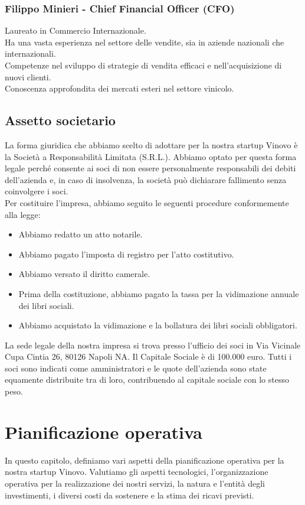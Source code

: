 \documentclass[12pt, a4paper]{article}
\newcommand{\meskip}{\medskip \\}
\begin{document}
\subsubsection*{Filippo Minieri - Chief Financial Officer (CFO)}
Laureato in Commercio Internazionale.\\
Ha una vasta esperienza nel settore delle vendite, sia in aziende nazionali che internazionali.\\
Competenze nel sviluppo di strategie di vendita efficaci e nell'acquisizione di nuovi clienti.\\
Conoscenza approfondita dei mercati esteri nel settore vinicolo.

\subsection{Assetto societario}
La forma giuridica che abbiamo scelto di adottare per la nostra startup Vinovo è la Società a Responsabilità Limitata (S.R.L.). Abbiamo optato per questa forma legale perché consente ai soci di non essere personalmente responsabili dei debiti dell'azienda e, in caso di insolvenza, la società può dichiarare fallimento senza coinvolgere i soci.\meskip
Per costituire l'impresa, abbiamo seguito le seguenti procedure conformemente alla legge:
\begin{itemize}
    \item Abbiamo redatto un atto notarile.
    \item Abbiamo pagato l'imposta di registro per l'atto costitutivo.
    \item Abbiamo versato il diritto camerale.
    \item Prima della costituzione, abbiamo pagato la tassa per la vidimazione annuale dei libri sociali.
    \item Abbiamo acquistato la vidimazione e la bollatura dei libri sociali obbligatori.
\end{itemize}
La sede legale della nostra impresa si trova presso l'ufficio dei soci in Via Vicinale Cupa Cintia 26, 80126 Napoli NA. Il Capitale Sociale è di 100.000 euro. Tutti i soci sono indicati come amministratori e le quote dell'azienda sono state equamente distribuite tra di loro, contribuendo al capitale sociale con lo stesso peso.

\section{Pianificazione operativa}
In questo capitolo, definiamo vari aspetti della pianificazione operativa per la nostra startup Vinovo. Valutiamo gli aspetti tecnologici, l'organizzazione operativa per la realizzazione dei nostri servizi, la natura e l'entità degli investimenti, i diversi costi da sostenere e la stima dei ricavi previsti.
\end{document}
